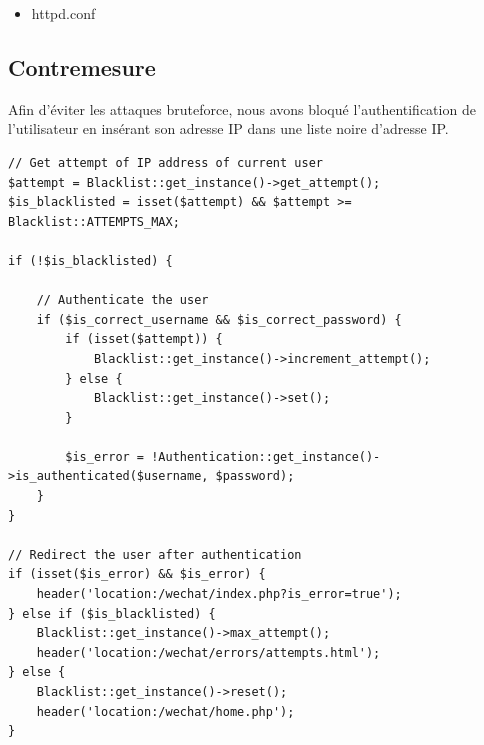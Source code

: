 \documentclass[12pt]{article}
\begin{document}
\begin{itemize}
\item httpd.conf
\end{itemize}

\newpage
\subsection{Contremesure}\label{c6}

Afin d'éviter les attaques bruteforce, nous avons bloqué l'authentification de l'utilisateur en insérant son adresse IP dans une liste noire d'adresse IP.

\begin{lstlisting}[style=JAVA]
// Get attempt of IP address of current user
$attempt = Blacklist::get_instance()->get_attempt();
$is_blacklisted = isset($attempt) && $attempt >= Blacklist::ATTEMPTS_MAX;

if (!$is_blacklisted) {
    
    // Authenticate the user
    if ($is_correct_username && $is_correct_password) {
        if (isset($attempt)) {
            Blacklist::get_instance()->increment_attempt();
        } else {
            Blacklist::get_instance()->set();
        }

        $is_error = !Authentication::get_instance()->is_authenticated($username, $password);
    }
}

// Redirect the user after authentication
if (isset($is_error) && $is_error) {
    header('location:/wechat/index.php?is_error=true');
} else if ($is_blacklisted) {
    Blacklist::get_instance()->max_attempt();
    header('location:/wechat/errors/attempts.html');
} else {
    Blacklist::get_instance()->reset();
    header('location:/wechat/home.php');
}
\end{lstlisting}
\end{document}

